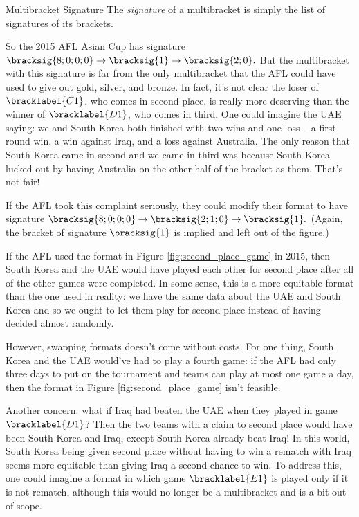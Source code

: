 {    \begin{definition}{Multibracket Signature}{}
        The \textit{signature} of a multibracket is simply the list of signatures of its brackets.
    \end{definition}

    So the 2015 AFL Asian Cup has signature $\bracksig{8;0;0;0} \to \bracksig{1} \to \bracksig{2;0}.$ But the multibracket with this signature is far from the only multibracket that the AFL could have used to give out gold, silver, and bronze. In fact, it's not clear the loser of $\bracklabel{C1}$, who comes in second place, is really more deserving than the winner of $\bracklabel{D1}$, who comes in third. One could imagine the UAE saying: we and South Korea both finished with two wins and one loss -- a first round win, a win against Iraq, and a loss against Australia. The only reason that South Korea came in second and we came in third was because South Korea lucked out by having Australia on the other half of the bracket as them. That's not fair!

    If the AFL took this complaint seriously, they could modify their format to have signature $\bracksig{8;0;0;0} \to \bracksig{2; 1; 0} \to \bracksig{1}.$ (Again, the bracket of signature $\bracksig{1}$ is implied and left out of the figure.)
    

    If the AFL used the format in Figure \ref{fig:second_place_game} in 2015, then South Korea and the UAE would have played each other for second place after all of the other games were completed. In some sense, this is a more equitable format than the one used in reality: we have the same data about the UAE and South Korea and so we ought to let them play for second place instead of having decided almost randomly.

    However, swapping formats doesn't come without costs. For one thing, South Korea and the UAE would've had to play a fourth game: if the AFL had only three days to put on the tournament and teams can play at most one game a day, then the format in Figure \ref{fig:second_place_game} isn't feasible.

    Another concern: what if Iraq had beaten the UAE when they played in game $\bracklabel{D1}$? Then the two teams with a claim to second place would have been South Korea and Iraq, except South Korea already beat Iraq! In this world, South Korea being given second place without having to win a rematch with Iraq seems more equitable than giving Iraq a second chance to win. To address this, one could imagine a format in which game $\bracklabel{E1}$ is played only if it is not rematch, although this would no longer be a multibracket and is a bit out of scope.

}
